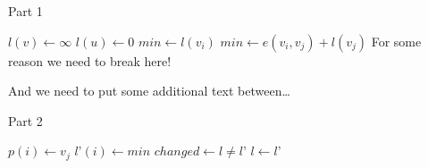 \documentclass[%
 reprint,
 amsmath,amssymb,
 aps,
]{revtex4-2}
\begin{document}
\begin{algorithm}[H]
\caption{Part 1}
\begin{algorithmic}[1]
        \State $l(v) \leftarrow \infty$
    \EndFor
    \State $l(u) \leftarrow 0$
    \Repeat
    \State $min \leftarrow l(v_i)$
    \State $min \leftarrow e(v_i, v_j) + l(v_j)$
    \State \Comment For some reason we need to break here!
\end{algorithmic}
\end{algorithm}

And we need to put some additional text between\dots

\begin{algorithm}[H]
\caption{Part 2}
\begin{algorithmic}[1]
\State $p(i) \leftarrow v_j$
\EndIf
\EndFor
\State $l’(i) \leftarrow min$
\EndFor
\State $changed \leftarrow l \not= l’$
\State $l \leftarrow l’$
\EndProcedure
\end{algorithmic}
\end{algorithm}
\end{document}
